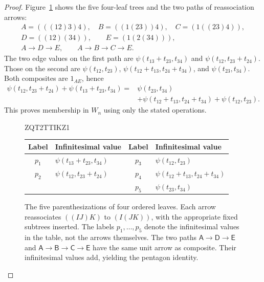 \documentclass[11pt]{article}
\theoremstyle{definition}
\theoremstyle{remark}
\numberwithin{equation}{section}
\begin{document}
\begin{proof}
Figure~\ref{fig:reassociation} shows the five four-leaf trees and
the two paths of reassociation arrows:
\[
\begin{gathered}
 A=(((12)3)4),\quad B=((1(23))4),\quad C=(1((23)4)),\\
 D=((12)(34)),\qquad E=(1(2(34))),\\
 A\longrightarrow D\longrightarrow E,
 \qquad A\longrightarrow B\longrightarrow C\longrightarrow E.
\end{gathered}
\]
The two edge values on the first path are
$\psi(t_{13}+t_{23},t_{34})$ and
$\psi(t_{12},t_{23}+t_{24})$.  Those on the second are
$\psi(t_{12},t_{23})$,
$\psi(t_{12}+t_{13},t_{24}+t_{34})$, and
$\psi(t_{23},t_{34})$.
Both composites are $1_{AE}$, hence
\begin{equation}\label{eq:category-pentagon}
\begin{split}
 \psi(t_{12},t_{23}+t_{24})+
 \psi(t_{13}+t_{23},t_{34})
 ={}&\psi(t_{23},t_{34})\\
 &+\psi(t_{12}+t_{13},t_{24}+t_{34})
 +\psi(t_{12},t_{23}).
\end{split}
\end{equation}
This proves membership in $W_n$ using only the stated operations.

\begin{figure}[!t]
  
  ZQT2TTIKZ1

   
  {\small
  \begin{tabular}{@{}cl@{\qquad}cl@{}}
    \toprule
    Label & Infinitesimal value & Label & Infinitesimal value \\
    \midrule
    $p_1$ & $\psi(t_{13}+t_{23},t_{34})$
      & $p_3$ & $\psi(t_{12},t_{23})$ \\
    $p_2$ & $\psi(t_{12},t_{23}+t_{24})$
      & $p_4$ & $\psi(t_{12}+t_{13},t_{24}+t_{34})$ \\
    & & $p_5$ & $\psi(t_{23},t_{34})$ \\
    \bottomrule
  \end{tabular}}
  \caption{The five parenthesizations of four ordered leaves. Each arrow
  reassociates $((IJ)K)$ to $(I(JK))$, with the appropriate fixed subtrees
  inserted. The labels $p_1,\ldots,p_5$ denote the infinitesimal values
  in the table, not the arrows themselves.
  The two paths $\mathsf{A}\to\mathsf{D}\to\mathsf{E}$ and
  $\mathsf{A}\to\mathsf{B}\to\mathsf{C}\to\mathsf{E}$ have the same unit
  arrow as composite. Their infinitesimal values add, yielding the pentagon
  identity.}
  \label{fig:reassociation}
\end{figure}



\end{proof}
\end{document}
